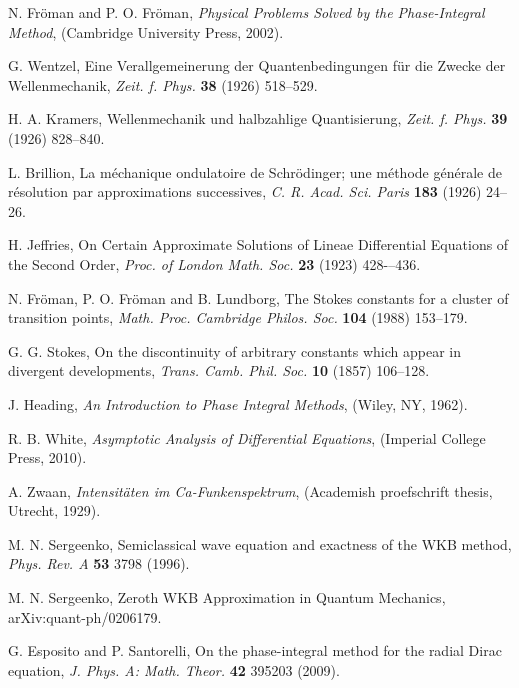 \documentclass{ws-m3as}
\begin{document}
\begin{thebibliography}{30}

 N. Fr\"oman and P. O. Fr\"oman, 
\textit{Physical Problems Solved by the Phase-Integral Method}, 
(Cambridge University Press, 2002).

 G. Wentzel, 
Eine Verallgemeinerung der Quantenbedingungen f\"ur die Zwecke der Wellenmechanik,
\textit{Zeit. f. Phys.} \textbf{38} (1926) 518--529.

 H. A. Kramers, 
Wellenmechanik und halbzahlige Quantisierung,
\textit{Zeit. f. Phys.} \textbf{39} (1926) 828--840.

 L. Brillion, 
La m\'echanique ondulatoire de Schr\"odinger; une m\'ethode
g\'en\'erale de r\'esolution par approximations successives,
\textit{C. R. Acad. Sci. Paris} \textbf{183} (1926) 24--26.

 H. Jeffries, 
On Certain Approximate Solutions of Lineae Differential Equations of the Second Order,
\textit{Proc. of London Math. Soc.} \textbf{23} (1923) 428-–436.

 N. Fr\"oman, P. O. Fr\"oman and B. Lundborg,
The Stokes constants for a cluster of transition points,
\textit{Math. Proc. Cambridge Philos. Soc.} \textbf{104} (1988) 153--179.

 G. G. Stokes, 
On the discontinuity of arbitrary constants which appear in divergent developments,
\textit{Trans. Camb. Phil. Soc.} \textbf{10} (1857) 106--128.

 J. Heading, 
\textit{An Introduction to Phase Integral Methods}, 
(Wiley, NY, 1962).

 R. B. White, 
\textit{Asymptotic Analysis of Differential Equations}, 
(Imperial College Press, 2010).

 A. Zwaan, 
\textit{Intensit\"aten im Ca-Funkenspektrum}, 
(Academish proefschrift thesis, Utrecht, 1929).

 M. N. Sergeenko,
Semiclassical wave equation and exactness of the WKB method,
\textit{Phys. Rev. A} \textbf{53} 3798 (1996).

 M. N. Sergeenko, 
Zeroth WKB Approximation in Quantum Mechanics,
arXiv:quant-ph/0206179.

 G. Esposito and P. Santorelli, 
On the phase-integral method for the radial Dirac equation,
\textit{J. Phys. A: Math. Theor.} \textbf{42} 395203 (2009).


\end{thebibliography}
\end{document}
